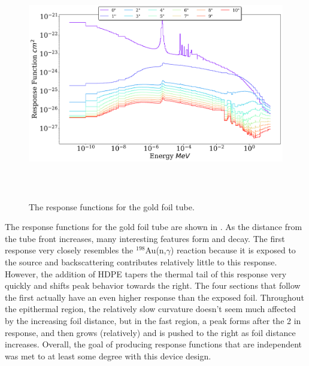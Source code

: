\begin{figure}[htb]
\centering
\includegraphics[height=4in]{tex/figures/ft_au.png}
\caption[Gold Foil Tube Response Functions]{The response functions for the gold foil tube.}
\label{fig:ft_au_rfs}
\end{figure}

The response functions for the gold foil tube are shown in .
As the distance from the tube front increases, many interesting features form and decay.
The first response very closely resembles the $^{198}$Au(n,$\gamma$) reaction because it is exposed to the source and backscattering contributes relatively little to this response.
However, the addition of HDPE tapers the thermal tail of this response very quickly and shifts peak behavior towards the right.
The four sections that follow the first actually have an even higher response than the exposed foil.
Throughout the epithermal region, the relatively slow curvature doesn't seem much affected by the increasing foil distance, but in the fast region, a peak forms after the 2 in response, and then grows (relatively) and is pushed to the right as foil distance increases.
Overall, the goal of producing response functions that are independent was met to at least some degree with this device design.

